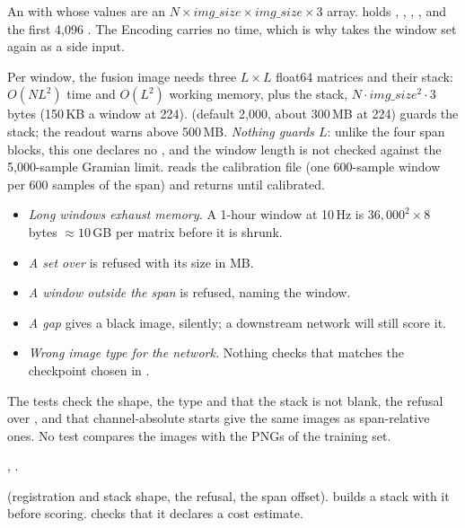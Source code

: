 An  with  whose values are an
$N \times \mathit{img\_size} \times \mathit{img\_size} \times 3$  array. 
holds , , , , 
and the first 4{,}096 . The Encoding carries no time, which is why
 takes the window set again as a side input.

Per window, the fusion image needs three $L \times L$ float64 matrices and their stack:
$O(N L^2)$ time and $O(L^2)$ working memory, plus the stack,
$N \cdot \mathit{img\_size}^2 \cdot 3$ bytes (150\,KB a window at 224). 
(default 2{,}000, about 300\,MB at 224) guards the stack; the readout warns above 500\,MB.
\emph{Nothing guards $L$}: unlike the four span blocks, this one declares no
, and the window length is not checked against the 5{,}000-sample
Gramian limit.  reads the calibration file (one 600-sample window per 600
samples of the span) and returns  until calibrated.

\begin{itemize}
\item \emph{Long windows exhaust memory.} A 1-hour window at 10\,Hz is $36{,}000^2 \times 8$
  bytes $\approx 10$\,GB per matrix before it is shrunk.
\item \emph{A set over}  is refused with its size in MB.
\item \emph{A window outside the span} is refused, naming the window.
\item \emph{A gap} gives a black image, silently; a downstream network will still score it.
\item \emph{Wrong image type for the network.} Nothing checks that  matches
  the checkpoint chosen in .
\end{itemize}

The tests check the shape, the type and that the stack is not blank, the refusal over
, and that channel-absolute starts give the same images as span-relative
ones. No test compares the images with the PNGs of the training set.

\citet{wang2015imaging}, \citet{eckmann1987recurrence}.

 (registration and stack shape, the
 refusal, the span offset).  builds a
stack with it before scoring.  checks that it declares a
cost estimate.
